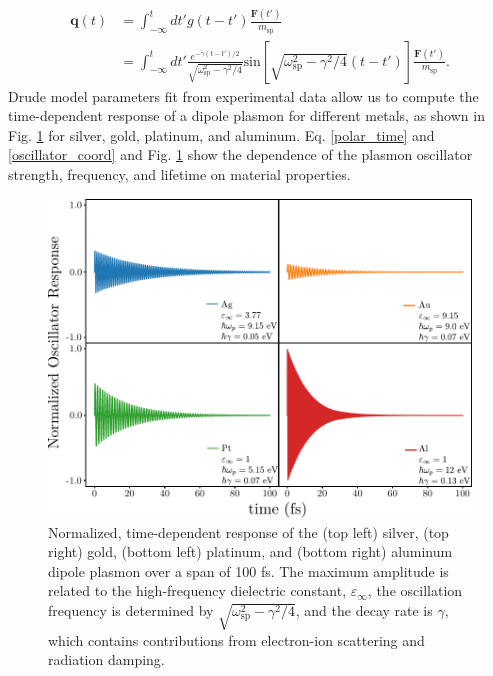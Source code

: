 \documentclass [11pt, proquest] {uwthesis}[2016/11/22]
\begin{document}
\begin{equation}
\begin{aligned}
\textbf{q}(t) & = \int_{-\infty}^{t}dt' g(t-t')\frac{\textbf{F}(t')}{m_{\textrm{sp}}}\\
&= \int_{-\infty}^{t}dt' \frac{e^{-\gamma(t-t')/2}}{\sqrt{\omega_{\textrm{sp}}^2-\gamma^2/4}}\textrm{sin}\left[\sqrt{\omega_{\textrm{sp}}^2-\gamma^2/4}(t-t')\right]\frac{\textbf{F}(t')}{m_{\textrm{sp}}}.
\label{oscillator_coord}
\end{aligned}
\end{equation}
Drude model parameters fit from experimental data \cite{JC,Rakic,Weaver,Segall} allow us to compute the time-dependent response of a dipole plasmon for different metals, as shown in Fig. \ref{alpha_metals} for silver, gold, platinum, and aluminum. Eq. \ref{polar_time} and \ref{oscillator_coord} and Fig. \ref{alpha_metals} show the dependence of the plasmon oscillator strength, frequency, and lifetime on material properties.

\begin{figure}
\begin{centering}
\includegraphics{all_alpha.pdf}
\caption{Normalized, time-dependent response of the (top left) silver, (top right) gold, (bottom left) platinum, and (bottom right) aluminum dipole plasmon over a span of 100 fs. The maximum amplitude is related to the high-frequency dielectric constant, $\varepsilon_{\infty}$, the oscillation frequency is determined by $\sqrt{\omega_{\textrm{sp}}^2 - \gamma^2/4}$, and the decay rate is $\gamma$, which contains contributions from electron-ion scattering and radiation damping.}
\label{alpha_metals}
\end{centering}
\end{figure}
\end{document}
